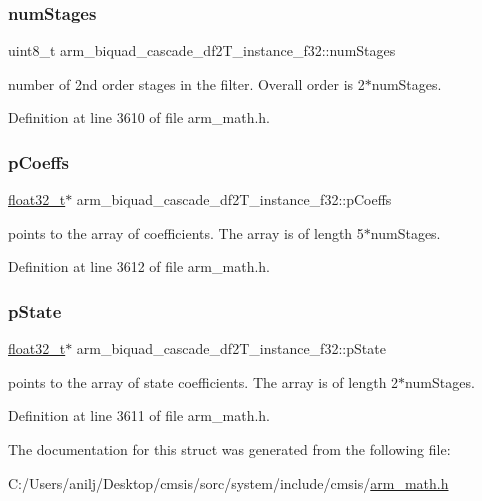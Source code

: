 \subsubsection{\texorpdfstring{num\+Stages}{numStages}}
{\footnotesize\ttfamily uint8\+\_\+t arm\+\_\+biquad\+\_\+cascade\+\_\+df2\+T\+\_\+instance\+\_\+f32\+::num\+Stages}

number of 2nd order stages in the filter. Overall order is 2$\ast$num\+Stages. 

Definition at line 3610 of file arm\+\_\+math.\+h.

\mbox{\label{structarm__biquad__cascade__df2_t__instance__f32_a49a24fe1b6ad3b0b26779c32d8d80b2e}} 
\subsubsection{\texorpdfstring{p\+Coeffs}{pCoeffs}}
{\footnotesize\ttfamily \hyperlink{arm__math_8h_a4611b605e45ab401f02cab15c5e38715}{float32\+\_\+t}$\ast$ arm\+\_\+biquad\+\_\+cascade\+\_\+df2\+T\+\_\+instance\+\_\+f32\+::p\+Coeffs}

points to the array of coefficients. The array is of length 5$\ast$num\+Stages. 

Definition at line 3612 of file arm\+\_\+math.\+h.

\mbox{\label{structarm__biquad__cascade__df2_t__instance__f32_a24d223addfd926a7177088cf2efe76b1}} 
\subsubsection{\texorpdfstring{p\+State}{pState}}
{\footnotesize\ttfamily \hyperlink{arm__math_8h_a4611b605e45ab401f02cab15c5e38715}{float32\+\_\+t}$\ast$ arm\+\_\+biquad\+\_\+cascade\+\_\+df2\+T\+\_\+instance\+\_\+f32\+::p\+State}

points to the array of state coefficients. The array is of length 2$\ast$num\+Stages. 

Definition at line 3611 of file arm\+\_\+math.\+h.



The documentation for this struct was generated from the following file\+:\begin{DoxyCompactItemize}
\item 
C\+:/\+Users/anilj/\+Desktop/cmsis/sorc/system/include/cmsis/\hyperlink{arm__math_8h}{arm\+\_\+math.\+h}\end{DoxyCompactItemize}
